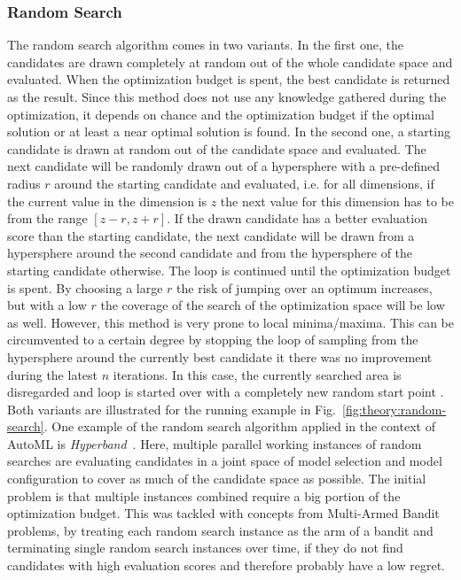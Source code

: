 \subsubsection{Random Search}
\label{sec:theory:optimization:search:random}
The random search algorithm comes in two variants.
In the first one, the candidates are drawn completely at random out of the whole candidate space and evaluated.
When the optimization budget is spent, the best candidate is returned as the result.
Since this method does not use any knowledge gathered during the optimization, it depends on chance and the optimization budget if the optimal solution or at least a near optimal solution is found.\newline
In the second one, a starting candidate is drawn at random out of the candidate space and evaluated.
The next candidate will be randomly drawn out of a hypersphere with a pre-defined radius $r$ around the starting candidate and evaluated, i.e. for all dimensions, if the current value in the dimension is $z$ the next value for this dimension has to be from the range $[z-r, z+r]$.
If the drawn candidate has a better evaluation score than the starting candidate, the next candidate will be drawn from a hypersphere around the second candidate and from the hypersphere of the starting candidate otherwise.
The loop is continued until the optimization budget is spent.
By choosing a large $r$ the risk of jumping over an optimum increases, but with a low $r$ the coverage of the search of the optimization space will be low as well.\newline
However, this method is very prone to local minima/maxima.
This can be circumvented to a certain degree by stopping the loop of sampling from the hypersphere around the currently best candidate it there was no improvement during the latest $n$ iterations.
In this case, the currently searched area is disregarded and loop is started over with a completely new random start point .
Both variants are illustrated for the running example in Fig.~\ref{fig:theory:random-search}.\newline
One example of the random search algorithm applied in the context of AutoML is \textit{Hyperband}~\cite{Li-Hyperband}.
Here, multiple parallel working instances of random searches are evaluating candidates in a joint space of model selection and model configuration to cover as much of the candidate space as possible.
The initial problem is that multiple instances combined require a big portion of the optimization budget.
This was tackled with concepts from Multi-Armed Bandit problems, by treating each random search instance as the arm of a bandit and terminating single random search instances over time, if they do not find candidates with high evaluation scores and therefore probably have a low regret.
